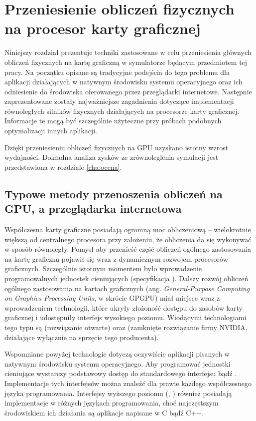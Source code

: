 \chapter{Przeniesienie obliczeń fizycznych na procesor karty graficznej}

Niniejszy rozdział prezentuje techniki zastosowane w celu przeniesienia głównych
obliczeń fizycznych na kartę graficzną w symulatorze  będącym
przedmiotem tej pracy. Na początku opisane są tradycyjne podejścia do tego
problemu dla aplikacji działających w natywnym środowisku systemu operacyjnego
oraz ich odniesienie do środowiska oferowanego przez przeglądarki internetowe.
Następnie zaprezentowane zostały najważniejsze zagadnienia dotyczące
implementacji równoległych silników fizycznych  działających na
procesorze karty graficznej. Informacje te mogą być szczególnie użyteczne przy
próbach podobnych optymalizacji innych aplikacji.

Dzięki przeniesieniu obliczeń fizycznych na GPU uzyskano istotny wzrost
wydajności. Dokładna analiza zysków ze zrównoleglenia symulacji jest przedstawiona
w rozdziale \ref{cha:ocena}.

\section{Typowe metody przenoszenia obliczeń na GPU, a przeglądarka internetowa}

Współczesna karty graficzne posiadają ogromną moc obliczeniową -- wielokrotnie
większą od centralnego procesora przy założeniu, że obliczenia da się wykonywać
w sposób równoległy. Pomysł aby przenieść część obliczeń ogólnego zastosowania
na kartę graficzną pojawił się wraz z dynamicznym rozwojem procesorów
graficznych. Szczególnie istotnym momentem było wprowadzenie programowalnych
jednostek cieniujących (specyfikacja ). Dalszy rozwój obliczeń
ogólnego zastosowania na kartach graficznych (ang. \emph{General-Purpose
Computing on Graphics Processing Units}, w skrócie GPGPU) miał miejsce wraz z
wprowadzeniem technologii, które ukryły złożoność dostępu do zasobów karty
graficznej i udostępniły interfejs wysokiego poziomu. Wiodącymi technologiami
tego typu są  (rozwiązanie otwarte) oraz  (zamknięte
rozwiązanie firmy NVIDIA, działające wyłącznie na sprzęcie tego producenta).

Wspomniane powyżej technologie dotyczą oczywiście aplikacji pisanych w natywnym
środowisku systemu operacyjnego. Aby programować jednostki cieniujące wystarczy
podstawowy dostęp do standardowego interfejsu  bądź .
Implementacje tych interfejsów można znaleźć dla prawie każdego współczesnego
języka programowania. Interfejsy wyższego poziomu (, )
również posiadają implementacje w różnych językach programowania, choć
najczęstszym środowiskiem ich działania są aplikacje napisane w C bądź C++.

